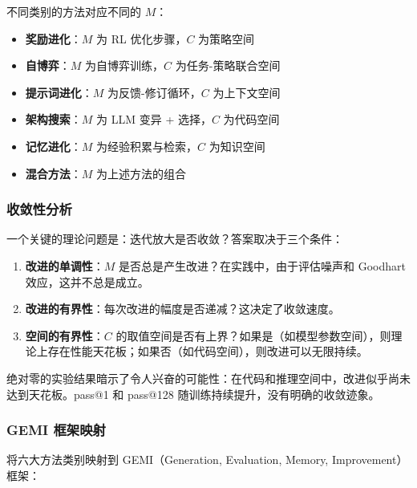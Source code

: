 不同类别的方法对应不同的 $M$：
\begin{itemize}
\item \textbf{奖励进化}：$M$ 为 RL 优化步骤，$C$ 为策略空间
\item \textbf{自博弈}：$M$ 为自博弈训练，$C$ 为任务-策略联合空间
\item \textbf{提示词进化}：$M$ 为反馈-修订循环，$C$ 为上下文空间
\item \textbf{架构搜索}：$M$ 为 LLM 变异 + 选择，$C$ 为代码空间
\item \textbf{记忆进化}：$M$ 为经验积累与检索，$C$ 为知识空间
\item \textbf{混合方法}：$M$ 为上述方法的组合
\end{itemize}

\subsubsection{收敛性分析}

一个关键的理论问题是：迭代放大是否收敛？答案取决于三个条件：
\begin{enumerate}
\item \textbf{改进的单调性}：$M$ 是否总是产生改进？在实践中，由于评估噪声和 Goodhart 效应，这并不总是成立。
\item \textbf{改进的有界性}：每次改进的幅度是否递减？这决定了收敛速度。
\item \textbf{空间的有界性}：$C$ 的取值空间是否有上界？如果是（如模型参数空间），则理论上存在性能天花板；如果否（如代码空间），则改进可以无限持续。
\end{enumerate}

绝对零的实验结果暗示了令人兴奋的可能性：在代码和推理空间中，改进似乎尚未达到天花板。pass@1 和 pass@128 随训练持续提升，没有明确的收敛迹象。

\subsubsection{GEMI 框架映射}

将六大方法类别映射到 GEMI（Generation, Evaluation, Memory, Improvement）框架：

\begin{table}[htbp]
\centering
\caption{六大方法在 GEMI 框架下的映射。}
\label{tab:gemi-mapping}
\end{table}

